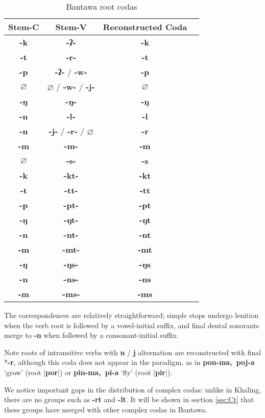 \documentclass[oldfontcommands,oneside,a4paper,11pt]{article}
\newcommand{\ipa}[1]{\textbf{{\phon\mbox{#1}}}} %
\begin{document}
\begin{table}[h]
\caption{Bantawa root codas} \centering \label{tab:bantawa.root}
\begin{tabular}{cccc}
\toprule
Stem-C & Stem-V & Reconstructed Coda \\
\midrule
\ipa{-k} & \ipa{-ʔ-} & \ipa{-k} \\
\ipa{-t} & \ipa{-r-} & \ipa{-t} \\
\ipa{-p} & \ipa{-ʔ-} /  \ipa{-w-} & \ipa{-p} \\
$\varnothing$ & $\varnothing$ / \ipa{-w-} / \ipa{-j-} & $\varnothing$ \\
\ipa{-ŋ} & \ipa{-ŋ-} & \ipa{-ŋ} \\
\ipa{-n} & \ipa{-l-} & \ipa{-l} \\
\ipa{-n} & \ipa{-j-} / \ipa{-r-} / $\varnothing$ & \ipa{-r} \\
\ipa{-m} & \ipa{-m-} & \ipa{-m} \\
$\varnothing$ & \ipa{-s-} & \ipa{-s} \\
\midrule
\ipa{-k} & \ipa{-kt-} & \ipa{-kt} \\
\ipa{-t} & \ipa{-tt-} & \ipa{-tt} \\
\ipa{-p} & \ipa{-pt-} & \ipa{-pt} \\
\ipa{-ŋ} & \ipa{-ŋt-} & \ipa{-ŋt} \\
\ipa{-n} & \ipa{-nt-} & \ipa{-nt} \\
\ipa{-m} & \ipa{-mt-} & \ipa{-mt} \\
\midrule
\ipa{-ŋ} & \ipa{-ŋs-} & \ipa{-ŋs}  \\
\ipa{-n} & \ipa{-ns-} & \ipa{-ns} \\
\ipa{-m} & \ipa{-ms-} & \ipa{-ms}   \\
\bottomrule
\end{tabular}
\end{table}

The correspondences are relatively straightforward; simple stops undergo lenition when the verb root is followed by a vowel-initial suffix, and final dental sonorants merge to \ipa{-n} when followed by a consonant-initial suffix. 

Note roots of intransitive verbs with \ipa{n} / \ipa{j} alternation are reconstructed with final *\ipa{-r}, although this coda does not appear in the paradigm, as in \ipa{pon-ma, poj-a} `grow' (root |\ipa{por}|) or \ipa{pin-ma, pi-a} `fly' (root |\ipa{pir}|).

We notice important gaps in the distribution of complex codas: unlike in Khaling, there are no groups such as \ipa{-rt} and \ipa{-lt}. It will be shown in section \ref{sec:Ct} that these groups have merged with other complex codas in Bantawa.
\end{document}
